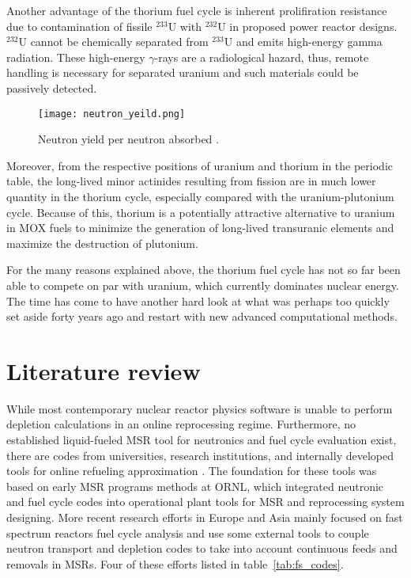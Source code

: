 Another advantage of the thorium fuel cycle is inherent prolifiration resistance due to contamination of fissile $^{233}$U with $^{232}$U in proposed power reactor designs. $^{232}$U cannot be chemically separated from $^{233}$U and  emits high-energy gamma radiation. These high-energy $\gamma$-rays are a radiological hazard, thus, remote handling is necessary for separated uranium and such materials could be passively detected.

\begin{figure}[htbp!] %
  \centering
  \vspace{-0.3em}
  \texttt{[image: neutron\_yeild.png]}
  \caption{Neutron yield per neutron absorbed \cite{anon_plutonium_1989}.}
  \vspace{-0.6em}
  \label{fig:n_yeild}
\end{figure}
\FloatBarrier

Moreover, from the respective positions of uranium and thorium in the periodic table, the long-lived minor actinides resulting from fission are in much lower quantity in the thorium cycle, especially compared with the uranium-plutonium cycle. Because of this, thorium is a potentially attractive alternative to uranium in \gls{MOX} fuels to minimize the generation of long-lived transuranic elements and maximize the destruction of plutonium.

For the many reasons explained above, the thorium fuel cycle has not so far been able to compete on par with uranium, which currently dominates nuclear energy. The time has come to have another hard look at what was perhaps too quickly set aside forty years ago and restart with new advanced computational methods. 

\section{Literature review}
While most contemporary nuclear reactor physics software is unable to perform depletion calculations in an online reprocessing regime. Furthermore, no established liquid-fueled \gls{MSR} tool for neutronics and fuel cycle evaluation exist, there are codes from universities, research institutions, and internally developed tools for online refueling approximation \cite{serp_molten_2014}. The foundation for these tools was based on early \gls{MSR} programs  methods at \gls{ORNL}, which integrated neutronic and fuel cycle codes \cite{bauman_rod:_1971} into operational plant tools \cite{kee_mrpp:_1976} for \gls{MSR} and reprocessing system designing. More recent research efforts in Europe and Asia mainly focused on fast spectrum reactors fuel cycle analysis and use some external tools to couple neutron transport and depletion codes to take into account continuous feeds and removals in \glspl{MSR}. Four of these efforts listed in table~\ref{tab:fs_codes}.

